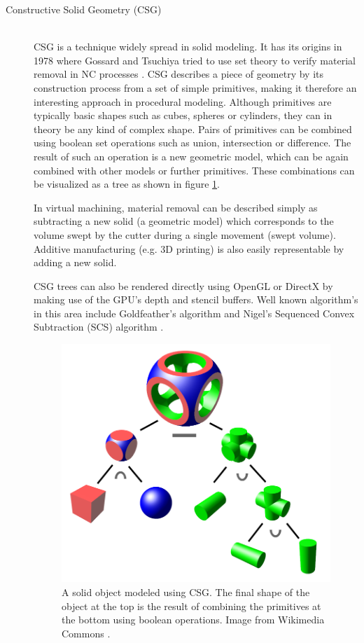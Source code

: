 \begin{description}
	\item[Constructive Solid Geometry (CSG)] \hfill \\
	CSG is a technique widely spread in solid modeling.
	It has its origins in 1978 where Gossard and Tsuchiya tried to use set theory to verify material removal in NC processes \cite{csg}.
	CSG describes a piece of geometry by its construction process from a set of simple primitives, making it therefore an interesting approach in procedural modeling.
	Although primitives are typically basic shapes such as cubes, spheres or cylinders, they can in theory be any kind of complex shape.
	Pairs of primitives can be combined using boolean set operations such as union, intersection or difference.
	The result of such an operation is a new geometric model, which can be again combined with other models or further primitives.
	These combinations can be visualized as a tree as shown in figure \ref{fig:csg_tree}.
	
	In virtual machining, material removal can be described simply as subtracting a new solid (a geometric model)  which corresponds to the volume swept by the cutter during a single movement (\aka swept volume).
	Additive manufacturing (e.g. 3D printing) is also easily representable by adding a new solid.
	
	CSG trees can also be rendered directly using OpenGL or DirectX by making use of the GPU's depth and stencil buffers.
	Well known algorithm's in this area include Goldfeather's algorithm \cite{goldfeather} and Nigel's Sequenced Convex Subtraction (SCS) algorithm \cite{scs}.
	
	\begin{figure}[h]
		\centering
		\includegraphics[width=\textwidth]{images/csg_tree}
		\caption{
			A solid object modeled using CSG.
			The final shape of the object at the top is the result of combining the primitives at the bottom using boolean operations.
			Image from Wikimedia Commons \cite{csg_tree}.
		}
		\label{fig:csg_tree}
	\end{figure}
	

\end{description}
